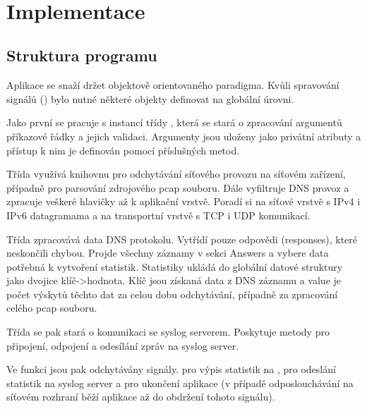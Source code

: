 \documentclass[11pt, a4paper, titlepage]{article}
\begin{document}
\begin{center}
	 \\
\end{center}

\newpage


\section{Implementace}

\subsection{Struktura programu}

Aplikace se snaží držet objektově orientovaného paradigma. Kvůli spravování signálů () bylo nutné některé objekty definovat na globální úrovni.
\bigskip

Jako první se pracuje s instancí třídy , která se stará o zpracování argumentů příkazové řádky a jejich validaci. Argumenty jsou uloženy jako privátní atributy a přístup k nim je definován pomocí příslušných metod.
\bigskip

Třída  využívá  knihovnu pro odchytávání síťového provozu na síťovém zařízení, případně pro parsování zdrojového pcap souboru. Dále vyfiltruje DNS provoz a zpracuje veškeré hlavičky až k aplikační vrstvě. Poradí si na síťové vrstvě s IPv4 i IPv6 datagramama a na transportní vrstvě s TCP i UDP komunikací.
\bigskip

Třída  zpracovává data DNS protokolu. Vytřídí pouze odpovědi (responses), které neskončili chybou. Projde všechny záznamy v sekci Answers a vybere data potřebná k vytvoření statistik. Statistiky ukládá do globální datové struktury  jako dvojice klíč->hodnota. Klíč jsou získaná data z DNS záznamu a value je počet výskytů těchto dat za celou dobu odchytávání, případně za zpracování celého pcap souboru.
\bigskip

Třída  se pak stará o komunikaci se syslog serverem. Poskytuje metody pro připojení, odpojení a odesílání zpráv na syslog server.
\bigskip

Ve funkci  jsou pak odchytávány signály.  pro výpis statistik na ,  pro odeslání statistik na syslog server a  pro ukončení aplikace (v případě odposlouchávání na síťovém rozhraní běží aplikace až do obdržení tohoto signálu).
\bigskip
\end{document}

